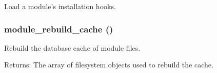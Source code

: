Load a module's installation hooks. \hypertarget{module_8inc_d906a52cfba472d859805466e64a5312}{
\subsubsection[{module\_\-rebuild\_\-cache}]{\setlength{\rightskip}{0pt plus 5cm}module\_\-rebuild\_\-cache ()}}
\label{module_8inc_d906a52cfba472d859805466e64a5312}


Rebuild the database cache of module files.

\begin{Desc}
\item[Returns:]The array of filesystem objects used to rebuild the cache. \end{Desc}

